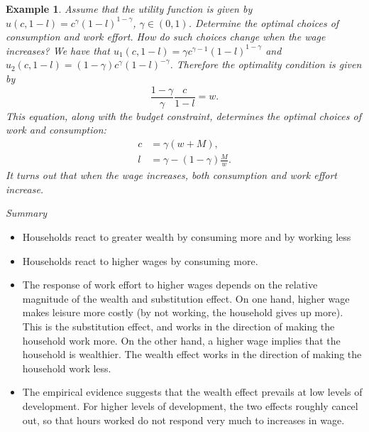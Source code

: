 \documentclass[letterpaper,12pt]{article}
\newtheorem{example}{Example}
\begin{document}
\begin{example}
Assume that the utility function is given by $u(c,1-l)=c^{\gamma}(1-l)^{1-\gamma}$,
$\gamma\in(0,1)$. Determine the optimal choices of consumption and work effort. How do such
choices change when the wage increases? We have that $u_{1}(c,1-l)=\gamma
c^{\gamma-1}(1-l)^{1-\gamma}$ and $u_{2}(c,1-l)=(1-\gamma)c^{\gamma}(1-l)^{-\gamma}$. Therefore
the optimality condition is given by
%
\begin{equation*}
\frac{1-\gamma}{\gamma}\frac{c}{1-l}=w.
\end{equation*}
%
This equation, along with the budget constraint, determines the optimal choices of work and
consumption:
%
\begin{align*}
c&=\gamma(w+M),\\
l&=\gamma-(1-\gamma)\frac{M}{w}.
\end{align*}
%
It turns out that when the wage increases, both consumption and work effort increase.

\end{example}

\normalsize

\textit{Summary}

\vspace{-.4cm}

\begin{itemize}

\item Households react to greater wealth by consuming more and by working less

\item Households react to higher wages by consuming more.

\item The response of work effort to higher wages depends on the relative magnitude of the wealth
and substitution effect. On one hand, higher wage makes leisure more costly (by not working, the
household gives up more). This is the substitution effect, and works in the direction of making
the household work more. On the other hand, a higher wage implies that the household is wealthier.
The wealth effect works in the direction of making the household work less.

\item The empirical evidence suggests that the wealth effect
prevails at low levels of development. For higher levels of
development, the two effects roughly cancel out, so that hours
worked do not respond very much to increases in wage.

\end{itemize}
\end{document}
